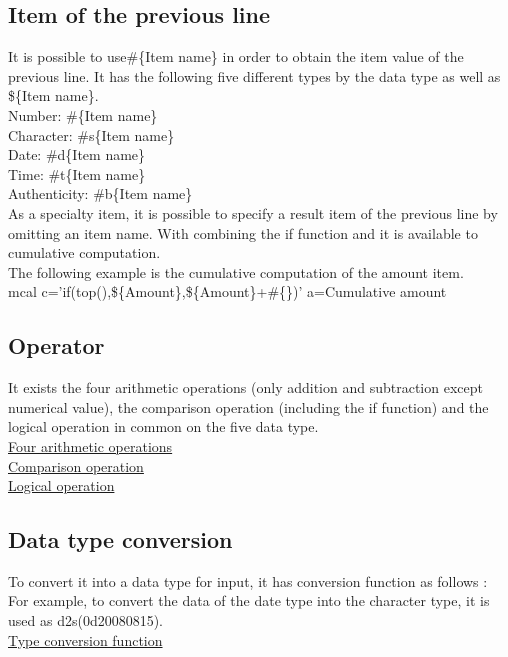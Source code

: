 \documentclass[fleqn,a4paper]{jarticle}
\begin{document}
\subsection*{Item of the previous line}
\noindent
It is possible to use\#\{Item name\} in order to obtain the item value of the previous line. It has the following five different types by the data type as well as \$\{Item name\}.\\
Number: \#\{Item name\}\\
Character: \#s\{Item name\}\\
Date: \#d\{Item name\}\\
Time: \#t\{Item name\}\\
Authenticity: \#b\{Item name\}\\
As a specialty item, it is possible to specify a result item of the previous line by omitting an item name. With combining the if function and it is available to cumulative computation.\\
The following example is the cumulative computation of the amount item.\\

mcal c='if(top(),\$\{Amount\},\$\{Amount\}+\#\{\})' a=Cumulative amount
 
\subsection*{Operator}
\noindent
It exists the four arithmetic operations (only addition and subtraction except numerical value), the comparison operation (including the if function) and the logical operation in common on the five data type.\\

\noindent
\href{run:sisoku.pdf}{Four arithmetic operations}\\
\href{run:hikaku.pdf}{Comparison operation}\\
\href{run:ronri.pdf}{Logical operation}\\

\subsection*{Data type conversion}
\noindent
To convert it into a data type for input, it has conversion function as follows :\\
For example, to convert the data of the date type into the character type, it is used as d2s(0d20080815).\\

\noindent
\href{run:katahenkan.pdf}{Type conversion function}\\
\end{document}
